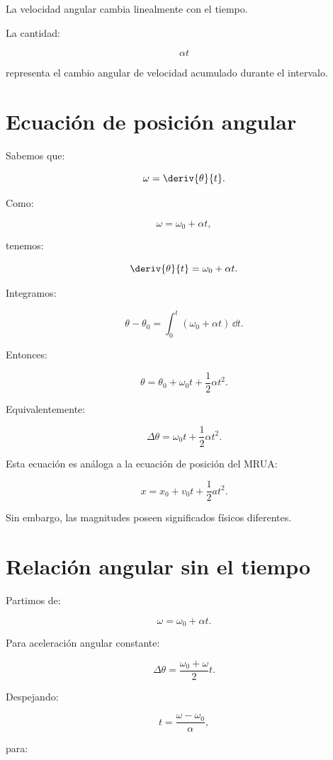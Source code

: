 \begin{interpretacion}

La velocidad angular cambia linealmente con el tiempo.

La cantidad:

\[
\alpha t
\]

representa el cambio angular de velocidad acumulado durante el intervalo.

\end{interpretacion}


\section{Ecuación de posición angular}

Sabemos que:

\[
\omega=\deriv{\theta}{t}.
\]

Como:

\[
\omega=\omega_0+\alpha t,
\]

tenemos:

\[
\deriv{\theta}{t}
=
\omega_0+\alpha t.
\]

Integramos:

\[
\theta-\theta_0
=
\int_0^t
(\omega_0+\alpha t)\,\dd t.
\]

Entonces:

\[
\boxed{
\theta
=
\theta_0
+
\omega_0t
+
\frac{1}{2}\alpha t^2
}.
\]

Equivalentemente:

\[
\boxed{
\Delta\theta
=
\omega_0t
+
\frac{1}{2}\alpha t^2
}.
\]

Esta ecuación es análoga a la ecuación de posición del MRUA:

\[
x=x_0+v_0t+\frac{1}{2}at^2.
\]

Sin embargo, las magnitudes poseen significados físicos diferentes.


\section{Relación angular sin el tiempo}

Partimos de:

\[
\omega=\omega_0+\alpha t.
\]

Para aceleración angular constante:

\[
\Delta\theta
=
\frac{\omega_0+\omega}{2}t.
\]

Despejando:

\[
t=\frac{\omega-\omega_0}{\alpha},
\]

para:

